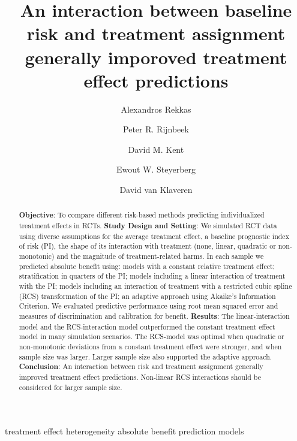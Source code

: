 \documentclass[]{elsarticle} %
\date{}
\begin{document}
\begin{frontmatter}

  \title{An interaction between baseline risk and treatment assignment
generally imporoved treatment effect predictions}
    \author[1]{Alexandros Rekkas}
  
    \author[1]{Peter R. Rijnbeek}
  
    \author[2]{David M. Kent}
  
    \author[3]{Ewout W. Steyerberg}
  
    \author[4]{David van Klaveren}
  
      \address[1]{Department of Medical Informatics, Erasmus Medical
Center, Rotterdam, The Netherlands}
    \address[2]{Predictive Analytics and Comparative Effectiveness
Center, Institute for Clinical Research and Health Policy Studies, Tufts
Medical Center, Boston, Massachusetts, USA}
    \address[3]{Department of Biomedical Data Sciences, Leiden
University Medical Center, Leiden, The Netherlands}
    \address[4]{Department of Public Health, Erasmus Medical Center,
Rotterdam, The Netherlands}
    
  \begin{abstract}
  \textbf{Objective}: To compare different risk-based methods predicting
  individualized treatment effects in RCTs. \textbf{Study Design and
  Setting}: We simulated RCT data using diverse assumptions for the
  average treatment effect, a baseline prognostic index of risk (PI),
  the shape of its interaction with treatment (none, linear, quadratic
  or non-monotonic) and the magnitude of treatment-related harms. In
  each sample we predicted absolute benefit using: models with a
  constant relative treatment effect; stratification in quarters of the
  PI; models including a linear interaction of treatment with the PI;
  models including an interaction of treatment with a restricted cubic
  spline (RCS) transformation of the PI; an adaptive approach using
  Akaike's Information Criterion. We evaluated predictive performance
  using root mean squared error and measures of discrimination and
  calibration for benefit. \textbf{Results}: The linear-interaction
  model and the RCS-interaction model outperformed the constant
  treatment effect model in many simulation scenarios. The RCS-model was
  optimal when quadratic or non-monotonic deviations from a constant
  treatment effect were stronger, and when sample size was larger.
  Larger sample size also supported the adaptive approach.
  \textbf{Conclusion}: An interaction between risk and treatment
  assignment generally improved treatment effect predictions. Non-linear
  RCS interactions should be considered for larger sample size.
  \end{abstract}
   \begin{keyword} treatment effect heterogeneity absolute
benefit prediction models\end{keyword}
 \end{frontmatter}
\end{document}
